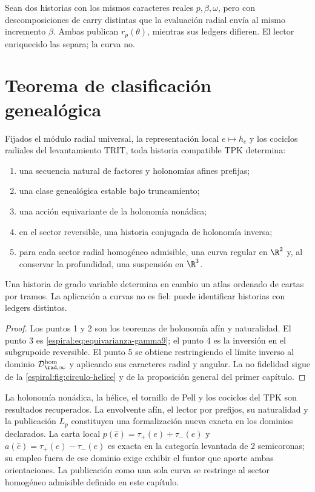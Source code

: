 \begin{example}
Sean dos historias con los mismos caracteres reales \(p,\beta,\omega\),
pero con descomposiciones de carry distintas que la evaluación radial envía
al mismo incremento \(\beta\). Ambas publican \(r_p(\theta)\), mientras sus
ledgers difieren. El lector enriquecido las separa; la curva no.
\end{example}

\section{Teorema de clasificación genealógica}

\begin{theorem}
Fijados el módulo radial universal, la representación local
\(e\mapsto h_e\) y los cociclos radiales del levantamiento TRIT, toda
historia compatible TPK determina:
\begin{enumerate}
\item una secuencia natural de factores y holonomías afines prefijas;
\item una clase genealógica estable bajo truncamiento;
\item una acción equivariante de la holonomía nonádica;
\item en el sector reversible, una historia conjugada de holonomía inversa;
\item para cada sector radial homogéneo admisible, una curva regular en
\(\R^2\) y, al conservar la profundidad, una suspensión en \(\R^3\).
\end{enumerate}
Una historia de grado variable determina en cambio un atlas ordenado de
cartas por tramos. La aplicación a curvas no es fiel: puede identificar
historias con ledgers distintos.
\end{theorem}
\begin{proof}
Los puntos 1 y 2 son los teoremas de holonomía afín y naturalidad. El punto
3 es \cref{espiral:eq:equivarianza-gamma9}; el punto 4 es la inversión en el
subgrupoide reversible. El punto 5 se obtiene restringiendo el límite
inverso al dominio \(\mathcal D_{\rad,\infty}^{\mathrm{hom}}\) y aplicando sus
caracteres radial y angular. La no fidelidad sigue de la
\cref{espiral:fig:circulo-helice} y de la proposición general del primer capítulo.
\end{proof}

\begin{statusbox}[title={Hipótesis, dominio y alcance del teorema}]
La holonomía nonádica, la hélice, el tornillo de Pell y los cociclos del TPK
son resultados recuperados. La envolvente afín, el lector por prefijos, su
naturalidad y la publicación \(L_p\) constituyen una formalización nueva
exacta en los dominios declarados. La carta local
\(p(\widehat e)=\tau_+(e)+\tau_-(e)\) y
\(a(\widehat e)=\tau_+(e)-\tau_-(e)\) es exacta en la categoría levantada
de 2 semicoronas; su empleo fuera de ese dominio exige exhibir el funtor que
aporte ambas orientaciones. La publicación como una sola curva se restringe
al sector homogéneo admisible definido en este capítulo.
\end{statusbox}
